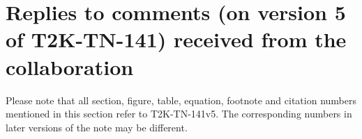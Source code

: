 \clearpage

\section{Replies to comments (on version 5 of T2K-TN-141) received from the collaboration}

{\color{red}
Please note that all section, figure, table, equation, footnote and citation 
numbers mentioned in this section refer to T2K-TN-141v5. 
The corresponding numbers in later versions of the note may be different.
}





